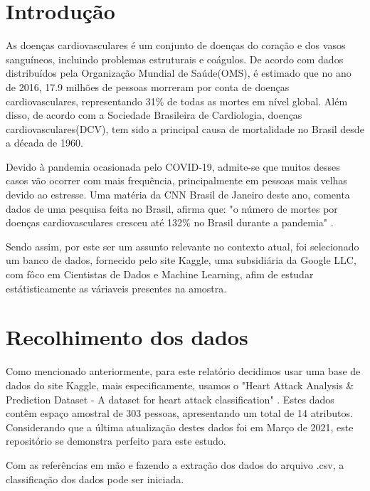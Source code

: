 \chapter*[Introdução]{Introdução}


    As doenças cardiovasculares é um conjunto de doenças do coração e dos vasos sanguíneos, incluindo 
    problemas estruturais e coágulos. De acordo com dados distribuídos pela Organização Mundial de Saúde(OMS), é estimado que no ano de 2016, 
    17.9 milhões de pessoas morreram por conta de doenças cardiovasculares, representando 31\% 
    de todas as mortes em nível global. Além disso, de acordo com a Sociedade Brasileira de Cardiologia, doenças cardiovasculares(DCV), tem sido a principal causa 
    de mortalidade no Brasil desde a década de 1960.

    Devido à pandemia ocasionada pelo COVID-19, admite-se que muitos desses casos vão ocorrer
    com mais frequência, principalmente em pessoas mais velhas devido ao estresse. Uma matéria da 
    CNN Brasil de Janeiro deste ano, comenta dados de uma pesquisa feita no Brasil, afirma 
    que: "o número de mortes por doenças cardiovasculares cresceu até 132\% no Brasil durante a pandemia"
    \cite{abccardiol}.

    Sendo assim, por este ser um assunto relevante no contexto atual, foi selecionado um banco de 
    dados, fornecido pelo site Kaggle, uma subsidiária da Google LLC, com fôco em Cientistas 
    de Dados e Machine Learning, afim de estudar estátisticamente as váriaveis presentes na amostra.

    \newpage
    \chapter{Recolhimento dos dados}

    Como mencionado anteriormente, para este relatório decidimos usar uma base de dados do 
    site Kaggle, mais especificamente, usamos o "Heart Attack Analysis \& Prediction Dataset
     - A dataset for heart attack classification" \cite{bancodedados}. Estes dados contêm 
    espaço amostral de 303 pessoas, apresentando um total de 14 atributos. Considerando que a
    última atualização destes dados foi em Março de 2021, este repositório se demonstra 
    perfeito para este estudo.

    Com as referências em mão e fazendo a extração dos dados do arquivo .csv, a classificação
    dos dados pode ser iniciada.

    \nocite{oms}

    \newpage